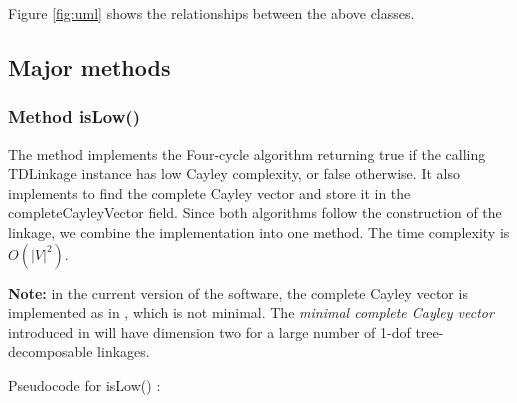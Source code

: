 \documentclass[10pt]{article}
\begin{document}
Figure \ref{fig:uml} shows the relationships between the above classes. 










\subsection{Major methods}
\label{sec:pseudocode}

\subsubsection{ Method \textsf{isLow()}} %
\label{sec:islow}


The method implements the Four-cycle algorithm \cite[Theorem 2]{Sitharam2011b} %
returning \textsf{true} if the calling \textsf{TDLinkage} instance has low Cayley complexity, or \textsf{false} otherwise.
It also implements  \cite[Theorem 3]{sitharam2014beast} to find the complete Cayley vector
and store it in  the  \textsf{completeCayleyVector} field. 
Since both algorithms follow the construction of the linkage, we combine the implementation into one method. 
The  time complexity is $O(|V|^2)$. 

\smallskip
\noindent\textbf{Note:} in the current version of the software, the complete Cayley vector is implemented 
as in \cite[Theorem 3]{sitharam2014beast}, which is not minimal. 
The \emph{minimal complete Cayley vector} introduced in \cite[Theorem 4]{Sitharam2011a} will have dimension two for a large number of 1-dof tree-decomposable linkages. 

\smallskip

\lstset{language=Java} 

\lstset{
  language=Java,
  tabsize=2,
  basicstyle=\footnotesize\sffamily,
  breaklines=true
}

 Pseudocode for  \textsf{isLow()} :
\end{document}
